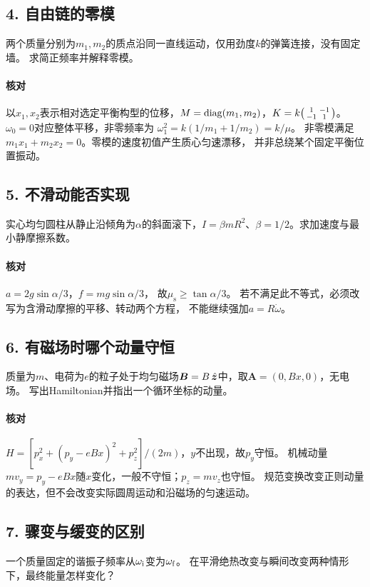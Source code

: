 \subsection*{4. 自由链的零模}
两个质量分别为$m_1,m_2$的质点沿同一直线运动，仅用劲度$k$的弹簧连接，没有固定墙。
求简正频率并解释零模。

\paragraph{核对}
以$x_1,x_2$表示相对选定平衡构型的位移，$M = \operatorname{diag}(m_1,m_2)$，$K = k\bigl(\begin{smallmatrix}1&-1\\-1&1\end{smallmatrix}\bigr)$。
$\omega_0 = 0$对应整体平移，非零频率为
$\omega_1^2 = k(1/m_1 + 1/m_2) = k/\mu$。
非零模满足$m_1x_1 + m_2x_2 = 0$。零模的速度初值产生质心匀速漂移，
并非总绕某个固定平衡位置振动。

\subsection*{5. 不滑动能否实现}
实心均匀圆柱从静止沿倾角为$\alpha$的斜面滚下，$I = \beta mR^2$、$\beta = 1/2$。求加速度与最小静摩擦系数。

\paragraph{核对}
$a = 2g\sin\alpha/3$，$f = mg\sin\alpha/3$，
故$\mu_{\mathrm s} \geq \tan\alpha/3$。
若不满足此不等式，必须改写为含滑动摩擦的平移、转动两个方程，
不能继续强加$a = R\dot\omega$。

\subsection*{6. 有磁场时哪个动量守恒}
质量为$m$、电荷为$e$的粒子处于均匀磁场$\bm B = B\mathop{}\!\hat{\bm{z}}$中，取$\bm A = (0,Bx,0)$，无电场。
写出Hamiltonian并指出一个循环坐标的动量。

\paragraph{核对}
$H = [p_x^2 + (p_y - eBx)^2 + p_z^2]/(2m)$，$y$不出现，故$p_y$守恒。
机械动量$mv_y = p_y - eBx$随$x$变化，一般不守恒；$p_z = mv_z$也守恒。
规范变换改变正则动量的表达，但不会改变实际圆周运动和沿磁场的匀速运动。

\subsection*{7. 骤变与缓变的区别}
一个质量固定的谐振子频率从$\omega_\mathrm i$变为$\omega_\mathrm f$。
在平滑绝热改变与瞬间改变两种情形下，最终能量怎样变化？

